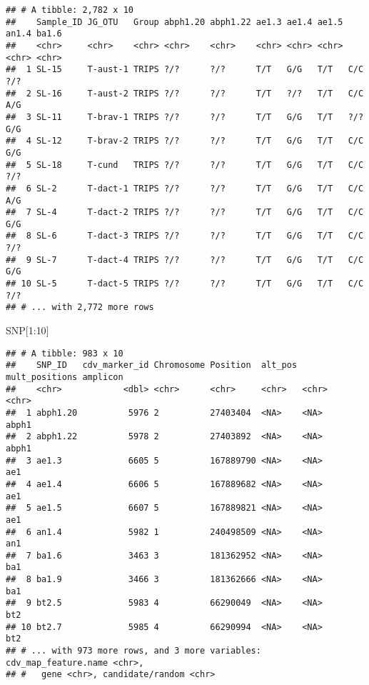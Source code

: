 \documentclass[
]{article}
\newenvironment{Shaded}{\begin{snugshade}}{\end{snugshade}}
\newcommand{\DecValTok}[1]{\textcolor[rgb]{0.00,0.00,0.81}{#1}}
\newcommand{\NormalTok}[1]{#1}
\newcommand{\SpecialCharTok}[1]{\textcolor[rgb]{0.00,0.00,0.00}{#1}}
\begin{document}
\begin{verbatim}
## # A tibble: 2,782 x 10
##    Sample_ID JG_OTU   Group abph1.20 abph1.22 ae1.3 ae1.4 ae1.5 an1.4 ba1.6
##    <chr>     <chr>    <chr> <chr>    <chr>    <chr> <chr> <chr> <chr> <chr>
##  1 SL-15     T-aust-1 TRIPS ?/?      ?/?      T/T   G/G   T/T   C/C   ?/?  
##  2 SL-16     T-aust-2 TRIPS ?/?      ?/?      T/T   ?/?   T/T   C/C   A/G  
##  3 SL-11     T-brav-1 TRIPS ?/?      ?/?      T/T   G/G   T/T   ?/?   G/G  
##  4 SL-12     T-brav-2 TRIPS ?/?      ?/?      T/T   G/G   T/T   C/C   G/G  
##  5 SL-18     T-cund   TRIPS ?/?      ?/?      T/T   G/G   T/T   C/C   ?/?  
##  6 SL-2      T-dact-1 TRIPS ?/?      ?/?      T/T   G/G   T/T   C/C   A/G  
##  7 SL-4      T-dact-2 TRIPS ?/?      ?/?      T/T   G/G   T/T   C/C   G/G  
##  8 SL-6      T-dact-3 TRIPS ?/?      ?/?      T/T   G/G   T/T   C/C   ?/?  
##  9 SL-7      T-dact-4 TRIPS ?/?      ?/?      T/T   G/G   T/T   C/C   G/G  
## 10 SL-5      T-dact-5 TRIPS ?/?      ?/?      T/T   G/G   T/T   C/C   ?/?  
## # ... with 2,772 more rows
\end{verbatim}

\begin{Shaded}
\begin{Highlighting}[]
\NormalTok{SNP[}\DecValTok{1}\SpecialCharTok{:}\DecValTok{10}\NormalTok{]}
\end{Highlighting}
\end{Shaded}

\begin{verbatim}
## # A tibble: 983 x 10
##    SNP_ID   cdv_marker_id Chromosome Position  alt_pos mult_positions amplicon
##    <chr>            <dbl> <chr>      <chr>     <chr>   <chr>          <chr>   
##  1 abph1.20          5976 2          27403404  <NA>    <NA>           abph1   
##  2 abph1.22          5978 2          27403892  <NA>    <NA>           abph1   
##  3 ae1.3             6605 5          167889790 <NA>    <NA>           ae1     
##  4 ae1.4             6606 5          167889682 <NA>    <NA>           ae1     
##  5 ae1.5             6607 5          167889821 <NA>    <NA>           ae1     
##  6 an1.4             5982 1          240498509 <NA>    <NA>           an1     
##  7 ba1.6             3463 3          181362952 <NA>    <NA>           ba1     
##  8 ba1.9             3466 3          181362666 <NA>    <NA>           ba1     
##  9 bt2.5             5983 4          66290049  <NA>    <NA>           bt2     
## 10 bt2.7             5985 4          66290994  <NA>    <NA>           bt2     
## # ... with 973 more rows, and 3 more variables: cdv_map_feature.name <chr>,
## #   gene <chr>, candidate/random <chr>
\end{verbatim}
\end{document}
